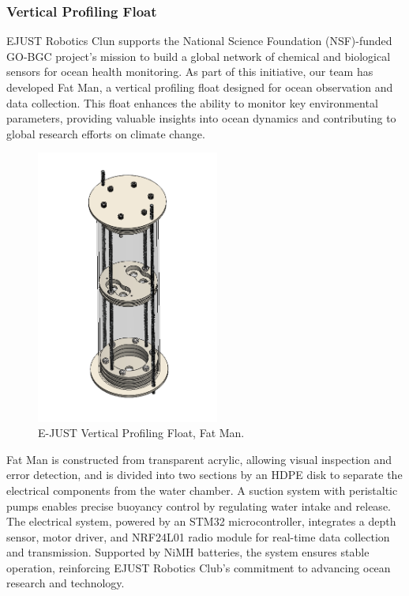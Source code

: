 \subsubsection{Vertical Profiling Float}

EJUST Robotics Clun supports the National Science Foundation (NSF)-funded GO-BGC project’s mission to build a global network of chemical and biological sensors for ocean health monitoring. As part of this initiative, our team has developed Fat Man, a vertical profiling float designed for ocean observation and data collection. This float enhances the ability to monitor key environmental parameters, providing valuable insights into ocean dynamics and contributing to global research efforts on climate change.

\begin{figure}[h]
    \centering
    \includegraphics[height=9cm]{Sections/2Design Rationale/images/float.png}
    \caption{E-JUST Vertical Profiling Float, Fat Man.}
    \label{fig:Float}
\end{figure}

Fat Man is constructed from transparent acrylic, allowing visual inspection and error detection, and is divided into two sections by an HDPE disk to separate the electrical components from the water chamber. A suction system with peristaltic pumps enables precise buoyancy control by regulating water intake and release. The electrical system, powered by an STM32 microcontroller, integrates a depth sensor, motor driver, and NRF24L01 radio module for real-time data collection and transmission. Supported by NiMH batteries, the system ensures stable operation, reinforcing EJUST Robotics Club's commitment to advancing ocean research and technology.